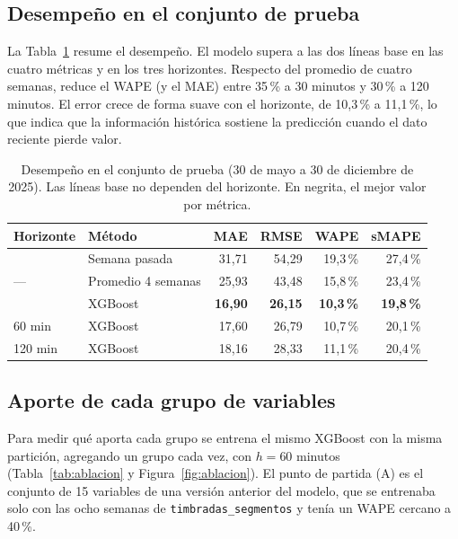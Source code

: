 \documentclass[11pt,a4paper]{article}
\begin{document}
\subsection{Desempeño en el conjunto de prueba}

La Tabla~\ref{tab:resultados} resume el desempeño. El modelo supera a las dos líneas base en las cuatro métricas y en los tres horizontes. Respecto del promedio de cuatro semanas, reduce el WAPE (y el MAE) entre 35\,\% a 30 minutos y 30\,\% a 120 minutos. El error crece de forma suave con el horizonte, de 10,3\,\% a 11,1\,\%, lo que indica que la información histórica sostiene la predicción cuando el dato reciente pierde valor.

\begin{table}[H]
  \centering
  \caption{Desempeño en el conjunto de prueba (30 de mayo a 30 de diciembre de 2025). Las líneas base no dependen del horizonte. En negrita, el mejor valor por métrica.}
  \label{tab:resultados}
  \small
  \begin{tabular}{llrrrr}
    \toprule
    Horizonte & Método & MAE & RMSE & WAPE & sMAPE \\
    \midrule
    \multirow{3}{*}{---}
      & Semana pasada      & 31,71 & 54,29 & 19,3\,\% & 27,4\,\% \\
      & Promedio 4 semanas & 25,93 & 43,48 & 15,8\,\% & 23,4\,\% \\
    \midrule
    30 min  & XGBoost & \textbf{16,90} & \textbf{26,15} & \textbf{10,3\,\%} & \textbf{19,8\,\%} \\
    60 min  & XGBoost & 17,60 & 26,79 & 10,7\,\% & 20,1\,\% \\
    120 min & XGBoost & 18,16 & 28,33 & 11,1\,\% & 20,4\,\% \\
    \bottomrule
  \end{tabular}
\end{table}

\subsection{Aporte de cada grupo de variables}

Para medir qué aporta cada grupo se entrena el mismo XGBoost con la misma partición, agregando un grupo cada vez, con $h=60$ minutos (Tabla~\ref{tab:ablacion} y Figura~\ref{fig:ablacion}). El punto de partida (A) es el conjunto de 15 variables de una versión anterior del modelo, que se entrenaba solo con las ocho semanas de \texttt{timbradas\_segmentos} y tenía un WAPE cercano a 40\,\%.
\end{document}
